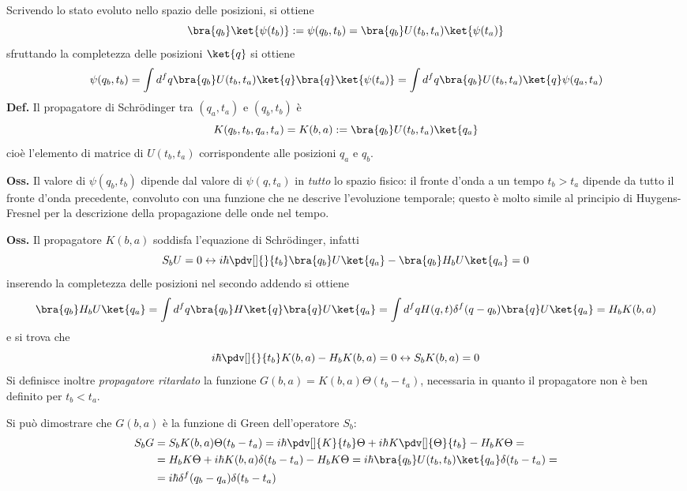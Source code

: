 Scrivendo lo stato evoluto nello spazio delle posizioni, si ottiene
$$\bra{q_b}\ket{\psi(t_b)}:=\psi(q_b,t_b) = \bra{q_b}U(t_b,t_a)\ket{\psi(t_a)}$$
sfruttando la completezza delle posizioni $\ket{q}$ si ottiene
\begin{equation}
\psi(q_b,t_b) = \int d^fq\bra{q_b}U(t_b,t_a)\ket{q}\bra{q}\ket{\psi(t_a)} = 
\int d^fq\bra{q_b}U(t_b,t_a)\ket{q}\psi(q_a,t_a)
\label{eq:K_def}
\end{equation}
\textbf{Def.} Il propagatore di Schrödinger tra $(q_a,t_a)$ e $(q_b,t_b)$ è
$$K(q_b,t_b,q_a,t_a) = K(b,a) := \bra{q_b}U(t_b,t_a)\ket{q_a}$$
cioè l'elemento di matrice di $U(t_b,t_a)$ corrispondente alle posizioni $q_a$ e $q_b$.

\textbf{Oss.} Il valore di $\psi(q_b,t_b)$ dipende dal valore di $\psi(q,t_a)$ in \textit{tutto} lo spazio
fisico: il fronte d'onda a un tempo $t_b>t_a$ dipende da tutto il fronte d'onda precedente, convoluto con
una funzione che ne descrive l'evoluzione temporale; questo è molto simile al principio di Huygens-Fresnel
per la descrizione della propagazione delle onde nel tempo.
\newpage

\textbf{Oss.} Il propagatore $K(b,a)$ soddisfa l'equazione di Schrödinger, infatti
$$S_bU=0\leftrightarrow i\hbar\pdv[]{}{t_b}\bra{q_b}U\ket{q_a}-\bra{q_b}H_bU\ket{q_a}=0$$
inserendo la completezza delle posizioni nel secondo addendo si ottiene
$$\bra{q_b}H_bU\ket{q_a} = \int d^fq \bra{q_b}H\ket{q}\bra{q}U\ket{q_a} = 
\int d^fq H(q,t)\delta^f(q-q_b)\bra{q}U\ket{q_a} = H_bK(b,a)$$
e si trova che
$$i\hbar\pdv[]{}{t_b}K(b,a) - H_bK(b,a)=0 \leftrightarrow S_bK(b,a)=0$$
Si definisce inoltre \textit{propagatore ritardato} la funzione $G(b,a) = K(b,a)\Theta(t_b-t_a)$, necessaria
in quanto il propagatore non è ben definito per $t_b<t_a$.

\noindent{}

Si può dimostrare che $G(b,a)$ è la funzione di Green dell'operatore $S_b$:
\begin{align*}	
    S_bG&=S_bK(b,a)\Theta(t_b-t_a) = i\hbar\pdv[]{K}{t_b}\Theta + i\hbar K\pdv[]{\Theta}{t_b} -H_bK\Theta =\\
    &=H_bK\Theta+i\hbar K(b,a)\delta(t_b-t_a)-H_bK\Theta=i\hbar\bra{q_b}U(t_b,t_b)\ket{q_a}\delta(t_b-t_a)=\\
    &=i\hbar\delta^f(q_b-q_a)\delta(t_b-t_a)
\end{align*}

